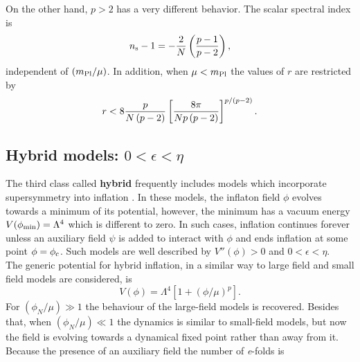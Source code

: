 \documentclass{rmaa}
\begin{document}
%
%
On the other
hand, $p > 2$ has a very different behavior. The scalar spectral index is
\begin{equation}
n_{\rm s}-1 = - {2 \over N} \left({p - 1 \over p - 2}\right),
\end{equation}
independent of $(m_{\rm Pl}/\mu)$. In addition, when $\mu < m_{\rm Pl}$ 
the values of $r$ are restricted by
\begin{equation}
r < 8 {p \over N \left(p - 2\right)} \left[{8 \pi \over N p \left(p -
2\right)}\right]^{p / \left(p - 2\right)}.
\end{equation}



\subsection{Hybrid models: $0 < \epsilon < \eta$}

The third class called \textbf{hybrid} frequently includes
models which incorporate supersymmetry into inflation \citep{Linde3, Copeland}. 
In these models, the inflaton field $\phi$ evolves
towards a minimum of its potential, however, the minimum has a vacuum energy 
$V(\phi_{\rm min}) = \Lambda^4$ which is different to zero. 
In such cases, inflation continues forever unless an
auxiliary field $\psi$ is added to interact with $\phi$ and ends inflation at some point $\phi = \phi_{\rm c}$. 
 Such models are well described by $V''\left(\phi\right) > 0$ and $0 < \epsilon < \eta$. 
\\

The generic potential for hybrid inflation, in a similar way to large field and small field models
are considered, is
\begin{equation}
V\left(\phi\right) = \Lambda^4 \left[1 + \left(\phi / \mu\right)^p\right].
\end{equation}
%
For $\left({\phi_N / \mu}\right)\gg 1$ the behaviour of
 the large-field models is recovered. Besides that, when $\left({\phi_N /
\mu}\right)\ll 1$ the dynamics is similar to small-field models, but
now the field is evolving towards a dynamical fixed point rather than away from it.  
%
Because the presence of an auxiliary field the number of {\it e}-folds is
\end{document}
